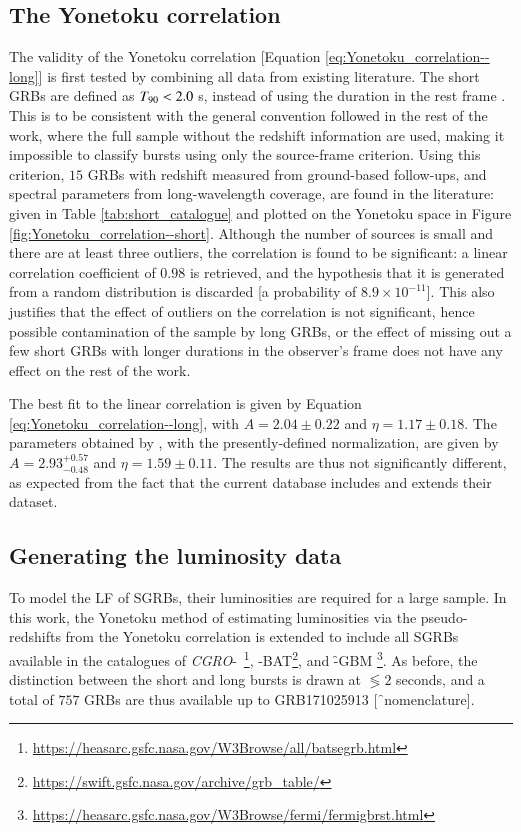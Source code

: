 \subsection{The Yonetoku correlation}
\label{subsec:Yonetoku_correlation--short}
The validity of the Yonetoku correlation [Equation \ref{eq:Yonetoku_correlation--long}] is first tested by combining all data from existing literature. The short GRBs are defined as $T_{\rm{90}} < 2.0$ s, instead of using the duration in the rest frame . This is to be consistent with the general convention followed in the rest of the work, where the full sample without the redshift information are used, making it impossible to classify bursts using only the source-frame criterion. Using this criterion, $15$ GRBs with redshift measured from ground-based follow-ups, and spectral parameters from long-wavelength coverage, are found in the literature: given in Table \ref{tab:short_catalogue} and plotted on the Yonetoku space in Figure \ref{fig:Yonetoku_correlation--short}. Although the number of sources is small and there are at least three outliers, the correlation is found to be significant: a linear correlation coefficient of $0.98$ is retrieved, and the hypothesis that it is generated from a random distribution is discarded [a probability of $8.9 \times 10^{-11}$]. This also justifies that the effect of outliers on the correlation is not significant, hence possible contamination of the sample by long GRBs, or the effect of missing out a few short GRBs with longer durations in the observer's frame \citep{Zhang_et_al.-2009-ApJ} does not have any effect on the rest of the work.

The best fit to the linear correlation is given by Equation \ref{eq:Yonetoku_correlation--long}, with $A = 2.04 \pm 0.22$ and $\eta = 1.17 \pm 0.18$. The parameters obtained by , with the presently-defined normalization, are given by $A = 2.93^{+0.57}_{-0.48}$ and $\eta = 1.59 \pm 0.11$. The results are thus not significantly different, as expected from the fact that the current database includes and extends their dataset.



\subsection{Generating the luminosity data}
\label{subsec:L-z_data_generation--short}
To model the LF of SGRBs, their luminosities are required for a large sample. In this work, the Yonetoku method of estimating luminosities via the pseudo-redshifts from the Yonetoku correlation is extended to include all SGRBs available in the catalogues of \emph{CGRO}-\B\ \citep{BATSE_catalogue--1997}\footnote{\url{https://heasarc.gsfc.nasa.gov/W3Browse/all/batsegrb.html}}, \s -BAT\footnote{\url{https://swift.gsfc.nasa.gov/archive/grb_table/}}, and \f -GBM \citep{Fermi_catalgoue--2016-ApJS}\footnote{\url{https://heasarc.gsfc.nasa.gov/W3Browse/fermi/fermigbrst.html}}. As before, the distinction between the short and long bursts is drawn at $\lessgtr 2$ seconds, and a total of $757$ GRBs are thus available up to GRB171025913 [\f\ nomenclature].

